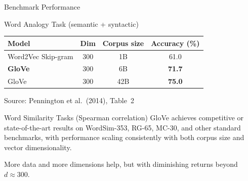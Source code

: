 \documentclass[11pt,aspectratio=169,professionalfonts]{beamer}
\begin{document}
%
%
\begin{frame}{Benchmark Performance}
  \begin{block}{Word Analogy Task (semantic + syntactic)}
    \centering
    \small
    \begin{tabular}{l c c c}
      \toprule
      \textbf{Model} & \textbf{Dim} & \textbf{Corpus size} & \textbf{Accuracy (\%)} \\
      \midrule
      Word2Vec Skip-gram  & 300 & 1B   & 61.0 \\
      \textbf{GloVe}      & 300 & 6B   & \textbf{71.7} \\
      GloVe               & 300 & 42B  & \textbf{75.0} \\
      \bottomrule
    \end{tabular}

    \vspace{4pt}
    {\footnotesize Source: Pennington et al.\ (2014), Table~2}
  \end{block}

  \vspace{6pt}
  \begin{block}{Word Similarity Tasks (Spearman correlation)}
    GloVe achieves competitive or state-of-the-art results on WordSim-353, RG-65, MC-30, and other standard benchmarks, with performance scaling consistently with both corpus size and vector dimensionality.
  \end{block}

  \vspace{4pt}
  More data and more dimensions help, but with diminishing returns beyond $d \approx 300$.
\end{frame}
%
%
\end{document}
